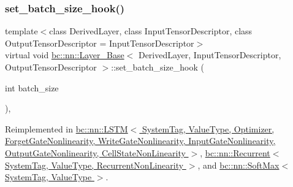 \mbox{\label{structbc_1_1nn_1_1Layer__Base_a8365fc3fc656aadeb0513d8e02b5fba0}} 
\subsubsection{\texorpdfstring{set\+\_\+batch\+\_\+size\+\_\+hook()}{set\_batch\_size\_hook()}}
{\footnotesize\ttfamily template$<$class Derived\+Layer, class Input\+Tensor\+Descriptor, class Output\+Tensor\+Descriptor = Input\+Tensor\+Descriptor$>$ \\
virtual void \hyperlink{structbc_1_1nn_1_1Layer__Base}{bc\+::nn\+::\+Layer\+\_\+\+Base}$<$ Derived\+Layer, Input\+Tensor\+Descriptor, Output\+Tensor\+Descriptor $>$\+::set\+\_\+batch\+\_\+size\+\_\+hook (\begin{DoxyParamCaption}\item[{int}]{batch\+\_\+size }\end{DoxyParamCaption})\hspace{0.3cm}{\ttfamily [inline]}, {\ttfamily [virtual]}}



Reimplemented in \hyperlink{structbc_1_1nn_1_1LSTM_af58d155c9bf27beb39b9898270515507}{bc\+::nn\+::\+L\+S\+T\+M$<$ System\+Tag, Value\+Type, Optimizer, Forget\+Gate\+Nonlinearity, Write\+Gate\+Nonlinearity, Input\+Gate\+Nonlinearity, Output\+Gate\+Nonlinearity, Cell\+State\+Non\+Linearity $>$}, \hyperlink{structbc_1_1nn_1_1Recurrent_a073803232421cd777c05be0362030630}{bc\+::nn\+::\+Recurrent$<$ System\+Tag, Value\+Type, Recurrent\+Non\+Linearity $>$}, and \hyperlink{structbc_1_1nn_1_1SoftMax_a0c4652a0da9f1d44e23d8856ca7b8278}{bc\+::nn\+::\+Soft\+Max$<$ System\+Tag, Value\+Type $>$}.

\mbox{\label{structbc_1_1nn_1_1Layer__Base_ae755158e9666fd592e1bdf419828ded1}} 
